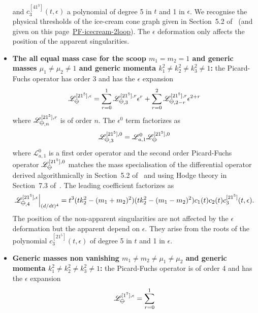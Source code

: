 \documentclass[a4paper,12pt]{article}
\numberwithin{equation}{section}
\numberwithin{figure}{section}
\newcommand{\IceCream}{	\begin{tikzpicture}[scale=0.05]
	\draw[color = black, fill=none] (2,0) arc(0:180:2);
		\draw [black] (-2,0) to (2,0);
		\draw [black] (-2,0) to (0,-2);
                	\draw [black] (2,0) to (0,-2);
	\end{tikzpicture}}
\begin{document}
\begin{itemize}
\begin{multline}
	\end{multline}
	and $c^{[41^3]}_3(t,\epsilon)$ a polynomial of  degree 5 in $t$ and 1 in
	$\epsilon$. We recognise the physical thresholds of the ice-cream
	cone graph given in Section~5.2 of~\cite{Lairez:2022zkj} (and given
	on this
	page~\href{https://nbviewer.org/github/pierrevanhove/PicardFuchs/blob/main/PF-icecream-2loop.ipynb}{PF-icecream-2loop}). The
	$\epsilon$ deformation only affects the position of the apparent singularities. 
	\item \textbf{The all equal mass case for the scoop
		$m_1=m_2=1$ and generic masses $\mu_1\neq\mu_2\neq1$ and generic
		momenta  $k_1^2\neq k_2^2\neq
		k_3^2\neq 1$:}  the Picard-Fuchs operator has order 3 and has the
	$\epsilon$ expansion
	\begin{equation}
		\mathscr{L}_{\IceCream}^{[21^5],\epsilon}=\sum_{r=0}^1
		\mathscr{L}_{\IceCream,3}^{[21^5],r} \epsilon^r+ \sum_{r=0}^2   \mathscr{L}_{\IceCream,2-r}^{[21^5],r} \epsilon^{2+r}
	\end{equation}
	where $ \mathscr{L}_{\IceCream,n}^{[21^5],r}$  is of order $n$. The
	$\epsilon^0$ term factorizes as
	\begin{equation}
		\mathscr{L}_{\IceCream,3}^{[21^5],0}=\mathscr{L}_{a,1}^0 \mathscr{L}_{\IceCream}^{[21^5] ,0      }
	\end{equation}
	where $\mathscr{L}_{a,1}^0$ is a first order operator and the second order
	Picard-Fuchs operator  $\mathscr{L}_{\IceCream}^{[21^5] ,0}
	$ matches the mass specialisation of the differential
	operator derived algorithmically in Section~5.2
	of~\cite{Lairez:2022zkj} and using Hodge theory in
	Section~7.3 of~\cite{Doran:2023yzu}.
	The leading coefficient factorizes as
	\begin{equation}
		\mathscr{L}_{\IceCream,4}^{[21^5],\epsilon}\Big|_{(d/dt)^4}=t^3
		(tk_2^2-(m_1+m_2)^2)(tk_2^2-(m_1-m_2)^2) c_1(t)
		c_2(t) c^{[21^5]}_3(t,\epsilon)   .
	\end{equation}
	The position of the non-apparent singularities are
	not affected by the $\epsilon$ deformation but the
	apparent depend on $\epsilon$. They arise from the
	roots of the polynomial $c^{[21^5]}_3(t,\epsilon)   $ of
	degree 5 in $t$ and 1 in $\epsilon$.
	\item \textbf{Generic masses non vanishing
		$m_1\neq m_2\neq\mu_1\neq\mu_2$ and generic
		momenta  $k_1^2\neq k_2^2\neq
		k_3^2\neq 1$:}  the Picard-Fuchs operator is of order 4 and has the
	$\epsilon$ expansion
	\begin{equation}
		\mathscr{L}_{\IceCream}^{[1^7],\epsilon}=\sum_{r=0}^1

\end{equation}
\end{itemize}
\end{document}

